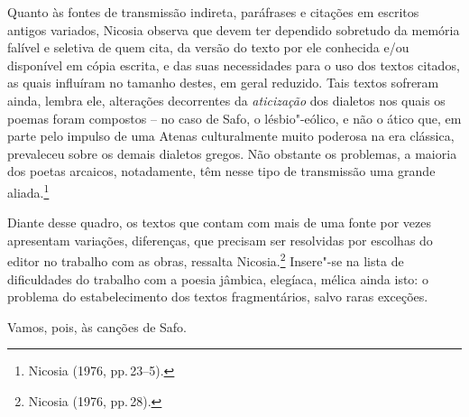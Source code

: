 Quanto às fontes de transmissão indireta, paráfrases e citações em escritos
antigos variados, Nicosia observa que devem ter dependido
sobretudo da memória falível e seletiva de quem cita, da versão do texto por
ele conhecida e/ou disponível em cópia escrita, e das suas necessidades para o
uso dos textos citados, as quais influíram no tamanho destes, em geral
reduzido. Tais textos sofreram ainda, lembra ele, alterações decorrentes da
\textit{aticização} dos dialetos nos quais os poemas foram compostos -- no caso de Safo,
o lésbio"-eólico, e não o ático que, em parte pelo impulso de uma Atenas
culturalmente muito poderosa na era clássica, prevaleceu sobre os demais
dialetos gregos. Não obstante os problemas, a maioria dos poetas
arcaicos, notadamente, têm nesse tipo de transmissão uma grande aliada.\footnote{ Nicosia (1976, pp.\,23--5).}

Diante desse quadro, os textos que contam com mais de uma fonte por vezes
apresentam variações, diferenças, que precisam ser resolvidas por escolhas do
editor no trabalho com as obras, ressalta Nicosia.\footnote{ Nicosia (1976, pp.\,28).} Insere"-se na lista
de dificuldades do trabalho com a poesia jâmbica, elegíaca, mélica
ainda isto: o problema do estabelecimento dos textos fragmentários, salvo raras
exceções. 

Vamos, pois, às canções de Safo.

